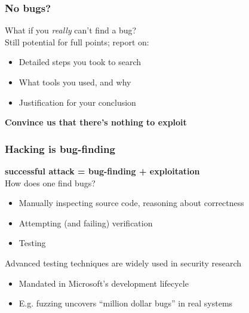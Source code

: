 \documentclass[10pt,xcolor={dvipsnames}]{beamer}
\begin{document}
\begin{frame}

\frametitle{No bugs?}

What if you \emph{really} can't find a bug?
\\[1em]

\pause
Still potential for full points; report on:
\begin{itemize}
\pause\item Detailed steps you took to search
\pause\item What tools you used, and why
\pause\item Justification for your conclusion \\[2em]
\end{itemize}

\pause
\textbf{Convince us that there's nothing to exploit}

\end{frame}


\begin{frame}

\frametitle{Hacking is bug-finding}

\textbf{successful attack = bug-finding + exploitation}
\\[1.5em]

\pause
How does one find bugs?
\begin{itemize}
\pause\item Manually inspecting source code, reasoning about correctness \\[0.5em]
\pause\item Attempting (and failing) verification \\[0.5em]
\pause\item Testing \\[1.5em]
\end{itemize}

\pause
Advanced testing techniques are widely used in security research
\begin{itemize}
\item Mandated in Microsoft's development lifecycle \\[0.5em]
\item E.g. fuzzing uncovers ``million dollar bugs'' in real systems \\[1.5em]
\end{itemize}

\end{frame}

\end{document}
